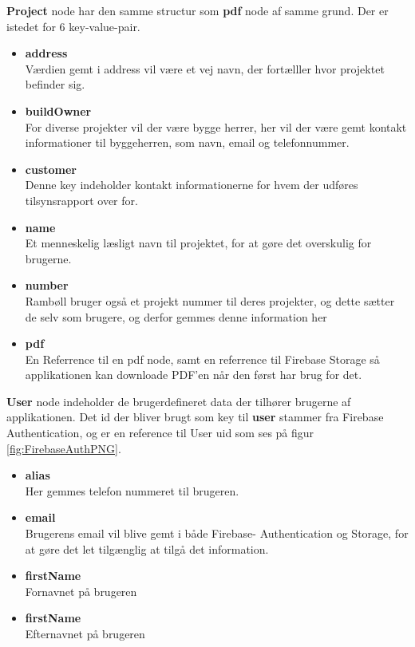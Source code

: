 	\textbf{Project} node har den samme structur som \textbf{pdf} node af samme grund. Der er istedet for 6 key-value-pair. 
	\begin{itemize}
		\item  \textbf{address}\\
		Værdien gemt i address vil være et vej navn, der fortælller hvor projektet befinder sig.\\
		\item  \textbf{buildOwner}\\
		For diverse projekter vil der være bygge herrer, her vil der være gemt kontakt informationer til byggeherren, som navn, email og telefonnummer. \\ 
		\item  \textbf{customer}\\
		Denne key indeholder kontakt informationerne for hvem der udføres tilsynsrapport over for.\\
		\item  \textbf{name}\\
		Et menneskelig læsligt navn til projektet, for at gøre det overskulig for brugerne.\\
		\item  \textbf{number}\\
		Rambøll bruger også et projekt nummer til deres projekter, og dette sætter de selv som brugere, og derfor gemmes denne information her\\
		\item  \textbf{pdf}\\
		En Referrence til en pdf node, samt en referrence til Firebase Storage så applikationen kan  downloade PDF'en når den først har brug for det.\\
	\end{itemize}

\textbf{User} node indeholder de brugerdefineret data der tilhører brugerne af applikationen. Det id der bliver brugt som key til \textbf{user} stammer fra Firebase Authentication, og er en reference til User uid som ses på figur \ref{fig:FirebaseAuthPNG}. 
\begin{itemize}
	\item \textbf{alias} \\
	Her gemmes telefon nummeret til brugeren. \\
	\item \textbf{email} \\
	Brugerens email vil blive gemt i både Firebase- Authentication og Storage, for at gøre det let tilgænglig at tilgå det information.\\
	\item \textbf{firstName} \\
	Fornavnet på brugeren\\
	\item \textbf{firstName} \\
	Efternavnet på brugeren\\

\end{itemize}

